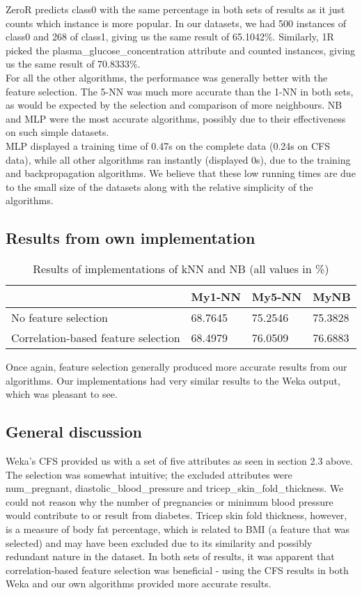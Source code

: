 \documentclass{article}
\begin{document}
ZeroR predicts class0 with the same percentage in both sets of results as it just counts which instance is more popular. In our datasets, we had 500 instances of class0 and 268 of class1, giving us the same result of 65.1042\%. Similarly, 1R picked the plasma\_glucose\_concentration attribute and counted instances, giving us the same result of 70.8333\%. \\
For all the other algorithms, the performance was generally better with the feature selection. The 5-NN was much more accurate than the 1-NN in both sets, as would be expected by the selection and comparison of more neighbours. NB and MLP were the most accurate algorithms, possibly due to their effectiveness on such simple datasets.  \\
MLP displayed a training time of 0.47s on the complete data (0.24s on CFS data), while all other algorithms ran instantly (displayed 0s), due to the training and backpropagation algorithms. We believe that these low running times are due to the small size of the datasets along with the relative simplicity of the algorithms.  \\

\subsection{Results from own implementation}
\begin{table}[h]
\centering
\begin{tabular}{@{}llll@{}}
\hline
 									& My1-NN & My5-NN & MyNB \\ \hline
No feature selection 					& 68.7645 & 75.2546 & 75.3828 \\
Correlation-based feature selection 	& 68.4979 & 76.0509 & 76.6883 \\ \hline
\end{tabular}
\caption {Results of implementations of kNN and NB (all values in \%)}
\end{table}

Once again, feature selection generally produced more accurate results from our algorithms. Our implementations had very similar results to the Weka output, which was pleasant to see. 

\subsection{General discussion}
Weka's CFS provided us with a set of five attributes as seen in section 2.3 above. The selection was somewhat intuitive; the excluded attributes were num\_pregnant, diastolic\_blood\_pressure and tricep\_skin\_fold\_thickness. We could not reason why the number of pregnancies or minimum blood pressure would contribute to or result from diabetes. Tricep skin fold thickness, however, is a measure of body fat percentage, which is related to BMI (a feature that was selected) and may have been excluded due to its similarity and possibly redundant nature in the dataset.
In both sets of results, it was apparent that correlation-based feature selection was beneficial - using the CFS results in both Weka and our own algorithms provided more accurate results.  
\end{document}
